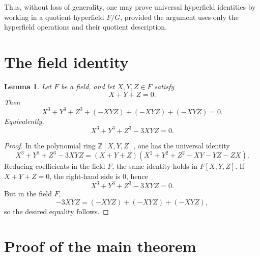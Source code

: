 \documentclass{article}
\newtheorem{lemma}[theorem]{Lemma}
\begin{document}
Thus, without loss of generality, one may prove universal hyperfield identities by working in a quotient hyperfield \(F/G\), provided the argument uses only the hyperfield operations and their quotient description.

\section{The field identity}

\begin{lemma}\label{lem:field-identity}
Let \(F\) be a field, and let \(X,Y,Z\in F\) satisfy
\[
X+Y+Z=0.
\]
Then
\[
X^3+Y^3+Z^3+(-XYZ)+(-XYZ)+(-XYZ)=0.
\]
Equivalently,
\[
X^3+Y^3+Z^3-3XYZ=0.
\]
\end{lemma}

\begin{proof}
In the polynomial ring \(\mathbb Z[X,Y,Z]\), one has the universal identity
\[
X^3+Y^3+Z^3-3XYZ
=
(X+Y+Z)(X^2+Y^2+Z^2-XY-YZ-ZX).
\]
Reducing coefficients in the field \(F\), the same identity holds in \(F[X,Y,Z]\). If \(X+Y+Z=0\), the right-hand side is \(0\), hence
\[
X^3+Y^3+Z^3-3XYZ=0.
\]
But in the field \(F\),
\[
-3XYZ=(-XYZ)+(-XYZ)+(-XYZ),
\]
so the desired equality follows.
\end{proof}

\section{Proof of the main theorem}
\end{document}
